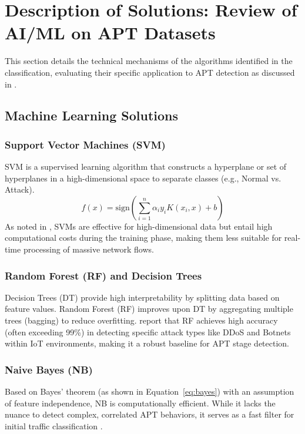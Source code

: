 \section{Description of Solutions: Review of AI/ML on APT Datasets}
\label{sec:description}

This section details the technical mechanisms of the algorithms identified in the classification, evaluating their specific application to APT detection as discussed in \cite{ankalaki2025cyber}.

\subsection{Machine Learning Solutions}

\subsubsection{Support Vector Machines (SVM)}
SVM is a supervised learning algorithm that constructs a hyperplane or set of hyperplanes in a high-dimensional space to separate classes (e.g., Normal vs. Attack). 
\begin{equation}
    f(x) = \text{sign}(\sum_{i=1}^{n} \alpha_i y_i K(x_i, x) + b)
\end{equation}
As noted in \cite{ankalaki2025cyber}, SVMs are effective for high-dimensional data but entail high computational costs during the training phase, making them less suitable for real-time processing of massive network flows.

\subsubsection{Random Forest (RF) and Decision Trees}
Decision Trees (DT) provide high interpretability by splitting data based on feature values. Random Forest (RF) improves upon DT by aggregating multiple trees (bagging) to reduce overfitting. \cite{ankalaki2025cyber} report that RF achieves high accuracy (often exceeding 99\%) in detecting specific attack types like DDoS and Botnets within IoT environments, making it a robust baseline for APT stage detection.

\subsubsection{Naive Bayes (NB)}
Based on Bayes' theorem (as shown in Equation~\ref{eq:bayes}) with an assumption of feature independence, NB is computationally efficient. While it lacks the nuance to detect complex, correlated APT behaviors, it serves as a fast filter for initial traffic classification \cite{ankalaki2025cyber}.

